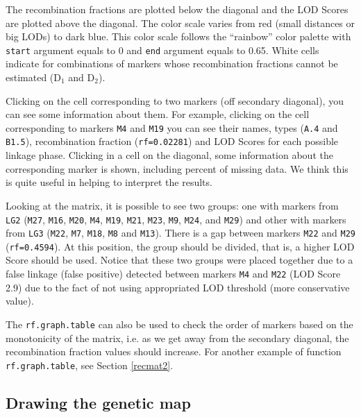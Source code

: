 \documentclass[letterpaper,12pt,oneside]{article}
\begin{document}
\begin{enumerate}
The recombination fractions are plotted below the diagonal and the LOD Scores are plotted above the diagonal. The color scale varies from red (small distances or big LODs) to dark blue. This color scale follows the ``rainbow'' color palette with {\tt start} argument equals to 0 and {\tt end} argument equals to 0.65. White cells indicate for combinations of markers whose recombination fractions cannot be estimated (D$_1$ and D$_2$). 

Clicking on the cell corresponding to two markers (off secondary diagonal), you can see some information about them. For example, clicking on the cell corresponding to markers {\tt M4} and {\tt M19} you can see their names, types ({\tt A.4} and {\tt B1.5}), recombination fraction ({\tt rf=0.02281}) and LOD Scores for each possible linkage phase. Clicking in a cell on the diagonal, some information about the corresponding marker is shown, including percent of missing data. We think this is quite useful in helping to interpret the results. 

Looking at the matrix, it is possible to see two groups: one with markers from {\tt LG2} ({\tt M27},  {\tt M16}, {\tt M20}, {\tt M4}, {\tt M19}, {\tt M21}, {\tt M23}, {\tt M9}, {\tt M24}, and {\tt M29}) and other with markers from {\tt LG3} ({\tt M22}, {\tt M7}, {\tt M18}, {\tt M8} and {\tt M13}). There is a gap between markers {\tt M22} and {\tt M29} ({\tt rf=0.4594}). At this position, the group should be divided, that is, a higher LOD Score should be used.  Notice that these two groups were placed together due to a false linkage (false positive) detected between markers {\tt M4} and {\tt M22} (LOD Score 2.9) due to the fact of not using appropriated LOD threshold (more conservative value). 

The {\tt rf.graph.table} can also be used to check the order of markers based on the monotonicity of the matrix, i.e. as we get away from the secondary diagonal, the recombination fraction values should increase. For another example of function {\tt rf.graph.table}, see Section \ref{recmat2}.

\end{enumerate}

\subsection{Drawing the genetic map}
\end{document}
